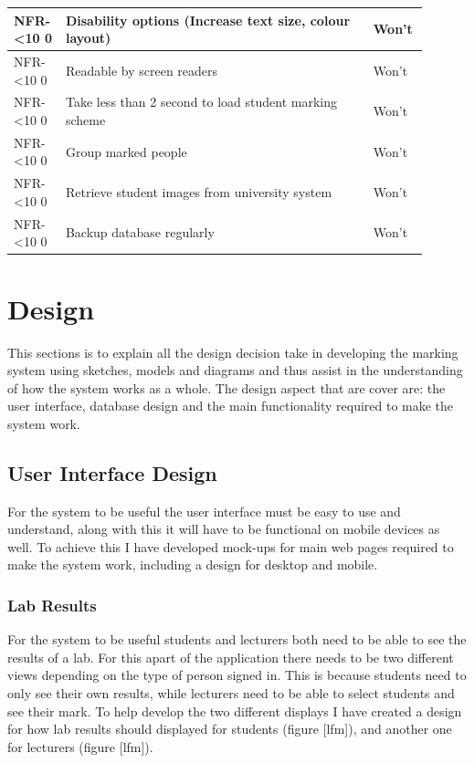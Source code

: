 \documentclass[12pt]{article}  %
\newcommand{\rid}[1]{\centering #1-\ifnum\value{requirement}<10 0\fi\arabic{requirement} \stepcounter{requirement}}
\begin{document}
\begin{spacing}{1.5}
\begin{longtable}{|p{0.1\linewidth}|p{0.7\linewidth}|p{0.1\linewidth}|}
\rid{NFR} & Disability options (Increase text size, colour layout) & Won't\\ \hline
\rid{NFR} & Readable by screen readers & Won't\\ \hline
\rid{NFR} & Take less than 2 second to load student marking scheme & Won't\\ \hline
\rid{NFR} & Group marked people & Won't \\ \hline
\rid{NFR} & Retrieve student images from university system & Won't\\ \hline
\rid{NFR} & Backup database regularly & Won't\\ \hline


\end{longtable}
\end{spacing}
\setcounter{requirement}{1}


\newpage
\section{Design}
This sections is to explain all the design decision take in developing the marking system using sketches, models and diagrams and thus assist in the understanding of how the system works as a whole. The design aspect that are cover are: the user interface, database design and the main functionality required to make the system work. 

\subsection{User Interface Design}
For the system to be useful the user interface must be easy to use and understand, along with this it will have to be functional on mobile devices as well. To achieve this I have developed mock-ups for main web pages required to make the system work, including a design for desktop and mobile. 

\subsubsection{Lab Results}
For the system to be useful students and lecturers both need to be able to see the results of a lab. For this apart of the application there needs to be two different views depending on the type of person signed in. This is because students need to only see their own results, while lecturers need to be able to select students and see their mark. To help develop the two different displays I have created a design for how lab results should displayed for students (figure [lfm]), and another one for lecturers (figure [lfm]). 
\end{document}

